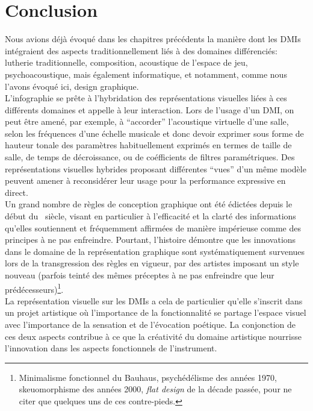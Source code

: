\section{Conclusion}

\noindent Nous avions déjà évoqué dans les chapitres précédents la manière dont les \glspl{DMI} intégraient des aspects traditionnellement liés à des domaines différenciés: lutherie traditionnelle, composition, acoustique de l'espace de jeu, psychoacoustique, mais également informatique, et notamment, comme nous l'avons évoqué ici, design graphique.\\
\indent L'infographie se prête à l'hybridation des représentations visuelles liées à ces différents domaines et appelle à leur interaction. Lors de l'usage d'un \gls{DMI}, on peut être amené, par exemple, à ``accorder'' l'acoustique virtuelle d'une salle, selon les fréquences d'une échelle musicale et donc devoir exprimer sous forme de hauteur tonale des paramètres habituellement exprimés en termes de taille de salle, de temps de décroissance, ou de coéfficients de filtres paramétriques. Des représentations visuelles hybrides proposant différentes ``vues'' d'un même modèle peuvent amener à reconsidérer leur usage pour la performance expressive en direct.\\
\indent Un grand nombre de règles de conception graphique ont été édictées depuis le début du ~siècle, visant en particulier à l'efficacité et la clarté des informations qu'elles soutiennent et fréquemment affirmées de manière impérieuse comme des principes à ne pas enfreindre. Pourtant, l'histoire démontre que les innovations dans le domaine de la représentation graphique sont systématiquement survenues lors de la transgression des règles en vigueur, par des artistes imposant un style nouveau (parfois teinté des mêmes préceptes à ne pas enfreindre que leur prédécesseurs)\footnote{Minimalisme fonctionnel du Bauhaus, psychédélisme des années 1970, skeuomorphisme des années 2000, \textit{flat design} de la décade passée, pour ne citer que quelques uns de ces contre-pieds.}.\\
\noindent La représentation visuelle sur les \glspl{DMI} a cela de particulier qu'elle s'inscrit dans un projet artistique où l'importance de la fonctionnalité se partage l'espace visuel avec l'importance de la sensation et de l'évocation poétique. La conjonction de ces deux aspects contribue à ce que la créativité du domaine artistique nourrisse l'innovation dans les aspects fonctionnels de l'instrument.\\
